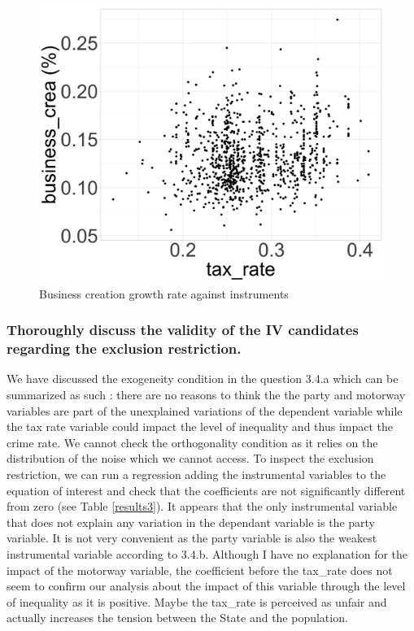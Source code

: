 \begin{figure}[htbp]
\begin{minipage}{0.33\textwidth}
    \includegraphics[width=\textwidth]{Exercise_3/OUTPUT/bcr_tx.png}
  \end{minipage}
  \caption{Business creation growth rate against instruments}
  \label{cor}
\end{figure}

\subsubsection{Thoroughly discuss the validity of the IV candidates regarding the exclusion restriction.}
We have discussed the exogeneity condition in the question 3.4.a which can be summarized as such :
there are no reasons to think the the party and motorway variables are part of the unexplained variations of the dependent variable while the tax rate variable could impact the level of inequality and thus impact the crime rate.
We cannot check the orthogonality condition as it relies on the distribution of the noise which we cannot access. 
To inspect the exclusion restriction, we can run a regression adding the instrumental variables to
the equation of interest and check that the coefficients are not significantly different from zero (see Table \ref{results3}).
It appears that the only instrumental variable that does not explain any variation in the
dependant variable is the party variable. It is not very convenient as
the party variable is also the weakest instrumental variable according to 3.4.b.
Although I have no explanation for the impact of the motorway variable, the coefficient
before the tax\_rate does not seem to confirm our analysis about the impact of this variable through the level
of inequality as it is positive. Maybe the tax\_rate is perceived as
unfair and actually increases the tension between the State and the population.


